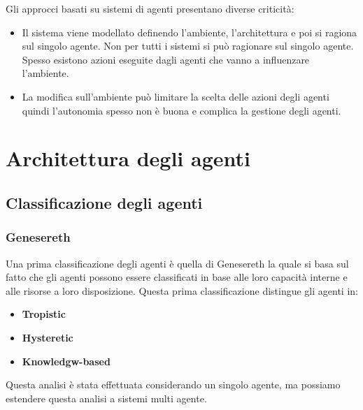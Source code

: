 Gli approcci basati su sistemi di agenti presentano diverse criticità:
\begin{itemize}
    \item Il sistema viene modellato definendo l'ambiente, l'architettura e poi
          si ragiona sul singolo agente. Non per tutti i sistemi si può ragionare
          sul singolo agente. Spesso esistono azioni eseguite dagli agenti che
          vanno a influenzare l'ambiente.
    \item La modifica sull'ambiente può limitare la scelta delle azioni degli
          agenti quindi l'autonomia spesso non è buona e complica la gestione
          degli agenti.
\end{itemize}
\section{Architettura degli agenti}
\subsection{Classificazione degli agenti}
\subsubsection{Genesereth}
Una prima classificazione degli agenti è quella di Genesereth la quale si basa
sul fatto che gli agenti possono essere classificati in base alle loro capacità
interne e alle risorse a loro disposizione. Questa prima classificazione
distingue gli agenti in:
\begin{itemize}
    \item \textbf{Tropistic}
    \item \textbf{Hysteretic}
    \item \textbf{Knowledgw-based}
\end{itemize}
\begin{nota}
    Questa analisi è stata effettuata considerando un singolo agente, ma
    possiamo estendere questa analisi a sistemi multi agente.
\end{nota}
